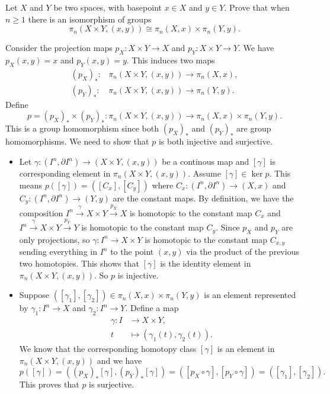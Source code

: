 \documentclass[a4paper, 12pt]{article}
\begin{document}
\begin{problem}{4}
Let \(X\) and \(Y\) be two spaces, with basepoint \(x\in X\) and \(y\in Y\). Prove that when \(n\geq 1\) there is an isomorphism of groups 
\[\pi_n(X\times Y,(x,y))\cong \pi_n(X,x)\times \pi_n(Y,y).\]
\end{problem}
\begin{solution}
Consider the projection maps \(p_X:X\times Y\rightarrow X\) and \(p_Y:X\times Y\rightarrow Y\). We have \(p_X(x,y)=x\) and \(p_Y(x,y)=y\). This induces two maps 
\begin{align*}
    (p_X)_*:&\pi_n(X\times Y,(x,y))\rightarrow \pi_n(X,x),\\ 
    (p_Y)_*:&\pi_n(X\times Y,(x,y))\rightarrow \pi_n(Y,y).
\end{align*}
Define 
\[p=(p_X)_*\times (p_Y)_*:\pi_n(X\times Y,(x,y))\rightarrow \pi_n(X,x)\times \pi_n(Y,y).\]
This is a group homomorphism since both \((p_X)_*\) and \((p_Y)_*\) are group homomorphisms. We need to show that \(p\) is both injective and surjective. 
\begin{itemize}
\item Let \(\gamma:(I^n,\partial I^n)\rightarrow (X\times Y,(x,y))\) be a continous map and \([\gamma]\) is corresponding element in \(\pi_n(X\times Y,(x,y))\). Assume \([\gamma]\in \ker p\). This means 
\(p([\gamma])=([C_x],[C_y])\) where \(C_x:(I^n,\partial I^n)\rightarrow (X,x)\) and \(C_y:(I^n,\partial I^n)\rightarrow (Y,y)\) are the constant maps. By definition, we have the composition 
\(I^n\xrightarrow{\gamma} X\times Y\xrightarrow{p_X} X\) is homotopic to the constant map \(C_x\) and \(I^n\xrightarrow{\gamma}X\times Y\xrightarrow{p_Y} Y\) is homotopic to the constant map \(C_y\). Since \(p_X\) and \(p_Y\) are only 
projections, so \(\gamma:I^n\rightarrow X\times Y\) is homotopic to the constant map \(C_{x,y}\) sending everything in \(I^n\) to the point \((x,y)\) via the product of the previous two homotopies. This shows that \([\gamma]\) is the identity element in \(\pi_n(X\times Y,(x,y))\). So 
\(p\) is injective.
\item Suppose \(([\gamma_1],[\gamma_2])\in \pi_n(X,x)\times \pi_n(Y,y)\) is an element represented by \(\gamma_1:I^n\rightarrow X\) and \(\gamma_2:I^n\rightarrow Y\). Define a map 
\begin{align*}
    \gamma:I&\rightarrow X\times Y,\\ 
    t&\mapsto (\gamma_1(t),\gamma_2(t)).
\end{align*}
We know that the corresponding homotopy class \([\gamma]\) is an element in \(\pi_n(X\times Y,(x,y))\) and we have 
\[p([\gamma])=((p_X)_*[\gamma],(p_Y)_*[\gamma])=([p_X\circ \gamma],[p_Y\circ \gamma])=([\gamma_1],[\gamma_2]).\]
This proves that \(p\) is surjective.
\end{itemize}
\end{solution}
\end{document}

